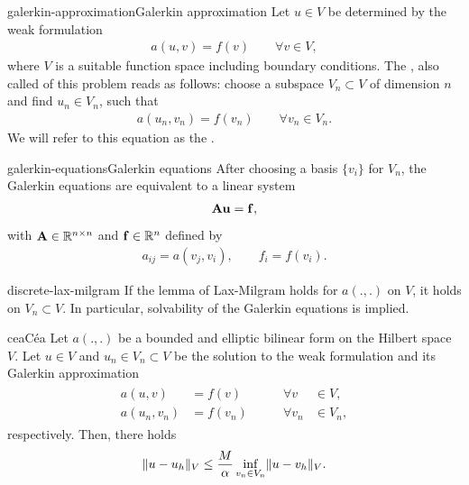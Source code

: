\begin{Definition*}{galerkin-approximation}{Galerkin approximation}
  Let $u\in V$ be determined by the weak formulation
  \begin{gather*}
    a(u,v) = f(v) \qquad\forall v\in V,
  \end{gather*}
  where $V$ is a suitable function space including boundary
  conditions. The , also called
   of this problem reads as follows:
  choose a subspace $V_n\subset V$ of dimension $n$ and find
  $u_n\in V_n$, such that
  \begin{gather*}
    a(u_n,v_n) = f(v_n) \qquad\forall v_n\in V_n.
  \end{gather*}
  We will refer to this equation as the .
\end{Definition*}

\begin{Corollary*}{galerkin-equations}{Galerkin equations}
  After choosing a basis $\{v_i\}$ for $V_n$, the Galerkin equations are
  equivalent to a linear system
  \begin{gather}
    \mathbf A \mathbf u = \mathbf f,
  \end{gather}
  with $\mathbf A\in\mathbb R^{n\times n}$ and $\mathbf f\in \mathbb R^n$ defined by
  \begin{gather}
    a_{ij} = a(v_j, v_i), \qquad f_i = f(v_i).
  \end{gather}
\end{Corollary*}

\begin{Lemma}{discrete-lax-milgram}
  If the lemma of Lax-Milgram holds for $a(.,.)$ on $V$, it holds on
  $V_n\subset V$. In particular, solvability of the Galerkin equations
  is implied.
\end{Lemma}

\begin{Lemma*}{cea}{Céa}
  Let $a(.,.)$ be a bounded and elliptic bilinear form on the Hilbert
  space $V$.  Let $u \in V$ and $u_n\in V_n \subset V$ be
  the solution to the weak formulation and its Galerkin approximation
  \begin{gather*}
    \begin{aligned}
      a(u,v) &= f(v) & \qquad\forall v&\in V,\\
      a(u_n,v_n) &= f(v_n) & \qquad\forall v_n&\in V_n,
    \end{aligned}
  \end{gather*}
  respectively. Then, there holds
  \begin{gather}
    \lVert u-u_h\rVert_V \le \frac{M}{\alpha}
    \inf_{v_n\in V_n}\lVert u-v_h\rVert_V.
  \end{gather}
\end{Lemma*}

